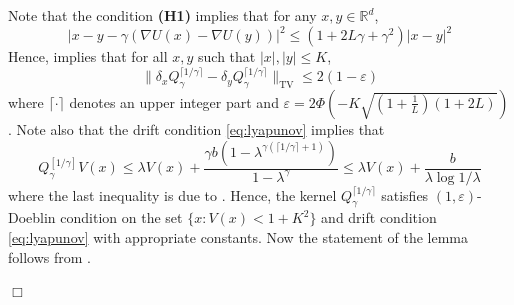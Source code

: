 \documentclass[bj]{imsart}
\def\rset{\mathbb{R}}
\def\rset{\mathbb{R}}
\newcommand{\proofendsign}{$\Box$}
\newenvironment{proof}{{\noindent \bf Proof }}
 {{\hspace*{\fill}\proofendsign\par\bigskip}}
\begin{document}
\begin{proof} Note that the condition {\bf (H1)} implies that for any $x,y \in \rset^d$,
\[
|x-y-\gamma(\nabla U(x) - \nabla U(y))|^2 \leq (1 + 2L\gamma + \gamma^2)|x-y|^2
\] 
Hence,   \cite[Corollary 5]{DurmusBortoli} implies that for all $x,y$ such that $|x|,|y| \leq K$,
\[
\|\delta_xQ^{\lceil 1/\gamma \rceil}_{\gamma} - \delta_yQ^{ \lceil 1/\gamma \rceil}_{\gamma}\|_{\text{TV}} \leq 2(1-\varepsilon)
\]
where $\lceil \cdot \rceil$ denotes an upper integer part and $\varepsilon = 2\Phi\left(-K\sqrt{\left(1+\frac{1}{L}\right)\left(1 + 2L\right)}\right)$. Note also that the drift condition \eqref{eq:lyapunov} implies that
\[
Q^{[1/\gamma]}_{\gamma}V(x) \leq \lambda V(x) + \frac{\gamma b(1-\lambda^{\gamma(\lceil 1/\gamma\rceil + 1)})}{1-\lambda^{\gamma}} \leq \lambda V(x) + \frac{b}{\lambda \log{1 /\lambda}} 
\]
where the last inequality is due to \cite[Lemma 1]{durmus:moulines:2017}. Hence, the kernel $Q^{\lceil 1/\gamma \rceil}_{\gamma}$ satisfies $(1,\varepsilon)$-Doeblin condition on the set $\{x: V(x) < 1+K^2\}$ and drift condition \eqref{eq:lyapunov} with appropriate constants. Now the statement of the lemma follows from \cite[Theorem~19.4.1]{moulines2018}.
\end{proof}
\end{document}
